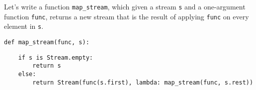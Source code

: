 \question Let's write a function \lstinline$map_stream$, which given a stream
\lstinline$s$ and a one-argument function \lstinline$func$, returns a new
stream that is the result of applying \lstinline$func$ on every element in
\lstinline$s$.

\begin{lstlisting}
def map_stream(func, s):
\end{lstlisting}
\begin{solution}[3cm]
\begin{lstlisting}
    if s is Stream.empty:
        return s
    else:
        return Stream(func(s.first), lambda: map_stream(func, s.rest))
\end{lstlisting}
\end{solution}
